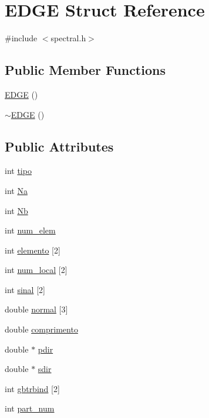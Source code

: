 \hypertarget{structEDGE}{}\section{E\+D\+GE Struct Reference}
\label{structEDGE}


{\ttfamily \#include $<$spectral.\+h$>$}

\subsection*{Public Member Functions}
\begin{DoxyCompactItemize}
\item 
\hyperlink{structEDGE_a502c871cbb5d66d17475061e7fff548a}{E\+D\+GE} ()
\item 
\hyperlink{structEDGE_a5a15e55729034ee840d2eac36fe3be23}{$\sim$\+E\+D\+GE} ()
\end{DoxyCompactItemize}
\subsection*{Public Attributes}
\begin{DoxyCompactItemize}
\item 
int \hyperlink{structEDGE_ae66eecd49a3fc1c8910631431925d5a4}{tipo}
\item 
int \hyperlink{structEDGE_a408340cfa46d83d300c4ed8b2900d30e}{Na}
\item 
int \hyperlink{structEDGE_ad0f1a447a4d1b262b2fa1eff986c3091}{Nb}
\item 
int \hyperlink{structEDGE_ac581aec971087849378dfbaadcf348d0}{num\+\_\+elem}
\item 
int \hyperlink{structEDGE_a60c9d8cbc65e29ca791d0e46f62e3806}{elemento} \mbox{[}2\mbox{]}
\item 
int \hyperlink{structEDGE_a90bb5dbccfbd03011a1d804e35cfe14c}{num\+\_\+local} \mbox{[}2\mbox{]}
\item 
int \hyperlink{structEDGE_a7f3d4b5d4f9959c2814157d3f5c8a72a}{sinal} \mbox{[}2\mbox{]}
\item 
double \hyperlink{structEDGE_a9f301d18d111fbc49b8eb67ead2cece8}{normal} \mbox{[}3\mbox{]}
\item 
double \hyperlink{structEDGE_ab4b0765a9fd5095fd67820144a329a94}{comprimento}
\item 
double $\ast$ \hyperlink{structEDGE_a8f7ef1d58c0bb5e80eaddf6bdba5e67e}{pdir}
\item 
double $\ast$ \hyperlink{structEDGE_a1d4086d11f2d42029de2bf64e8624eff}{sdir}
\item 
int \hyperlink{structEDGE_ad7e004eef079a66034a4d3a3d5c2a62e}{gbtrbind} \mbox{[}2\mbox{]}
\item 
int \hyperlink{structEDGE_a141ff580277e62d4726b4bdc4f6b8f2f}{part\+\_\+num}
\end{DoxyCompactItemize}


